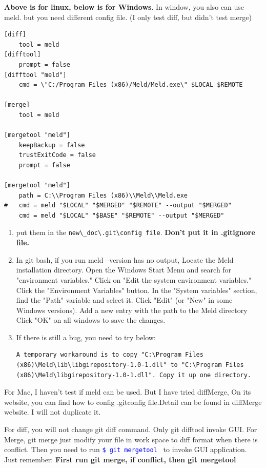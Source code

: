 \documentclass[paper=8.5in:11in, twoside, 12pt, pagesize=pdftex]{book}
\newcommand{\linuxcommand}[1]{\texttt{\textcolor{blue}{\$ #1 \Pisymbol{psy}{191}}}}
\begin{document}
	\textbf{Above is for linux, below is for Windows}. In window, you also can use meld. but you need different config file. (I only test diff, but didn't test merge)
\begin{lstlisting}       
[diff]
	tool = meld
[difftool]
	prompt = false
[difftool "meld"]
	cmd = \"C:/Program Files (x86)/Meld/Meld.exe\" $LOCAL $REMOTE

[merge]
	tool = meld

[mergetool "meld"]
	keepBackup = false
	trustExitCode = false
	prompt = false

[mergetool "meld"]
	path = C:\\Program Files (x86)\\Meld\\Meld.exe
#	cmd = meld "$LOCAL" "$MERGED" "$REMOTE" --output "$MERGED"
	cmd = meld "$LOCAL" "$BASE" "$REMOTE" --output "$MERGED"		
\end{lstlisting}
	\begin{enumerate}
		\item put them in the \verb|new\_doc\.git\config file|. \textbf{Don't put it in .gitignore file.}
		
		\item In git bash, if you run meld --version has no output, Locate the Meld installation directory. Open the Windows Start Menu and search for "environment variables."
		Click on "Edit the system environment variables."
		Click the "Environment Variables" button.
		In the "System variables" section, find the "Path" variable and select it.
		Click "Edit" (or "New" in some Windows versions).
		Add a new entry with the path to the Meld directory 
		Click "OK" on all windows to save the changes.
		
		\item If there is still a bug, you need to try below:
\begin{lstlisting}       
A temporary workaround is to copy "C:\Program Files
(x86)\Meld\lib\libgirepository-1.0-1.dll" to "C:\Program Files (x86)\Meld\libgirepository-1.0-1.dll". Copy it up one directory.
\end{lstlisting}
		
	\end{enumerate}
	
	For Mac, I haven't test if meld can be used. But I have tried diffMerge, On its website, you can find how to config .gitconfig file.Detail can be found in diffMerge website. I will not duplicate it.
	
	For diff, you will not change git diff command. Only git difftool invoke GUI. For Merge, git merge just modify your file in work space to diff format when there is conflict. Then you need to run \linuxcommand{git mergetool} to invoke GUI application.  Just remember: \textbf{First run git merge, if conflict, then git mergetool}
	
\end{document}

